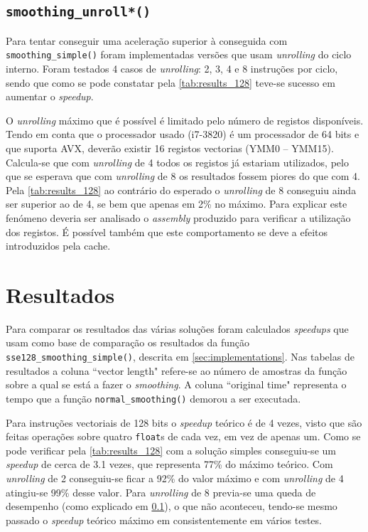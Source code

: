 \documentclass[a4paper]{article}
\begin{document}
	
	\subsection{\texttt{smoothing\_unroll*()}}
	\label{subsec:implementation_unrolling}
	
	Para tentar conseguir uma aceleração superior à conseguida com \texttt{smoothing\_simple()} foram implementadas versões que usam \textit{unrolling} do ciclo interno. Foram testados 4 casos de \textit{unrolling}: 2, 3, 4 e 8 instruções por ciclo, sendo que como se pode constatar pela \autoref{tab:results_128} teve-se sucesso em aumentar o \textit{speedup}.
	
	O \textit{unrolling} máximo que é possível é limitado pelo número de registos disponíveis. Tendo em conta que o processador usado (i7-3820) é um processador de 64 bits e que suporta AVX, deverão existir 16 registos vectorias (YMM0 -- YMM15). Calcula-se que com \textit{unrolling} de 4 todos os registos já estariam utilizados, pelo que se esperava que com \textit{unrolling} de 8 os resultados fossem piores do que com 4. Pela \autoref{tab:results_128} ao contrário do esperado o \textit{unrolling} de 8 conseguiu ainda ser superior ao de 4, se bem que apenas em 2\% no máximo. Para explicar este fenómeno deveria ser analisado o \textit{assembly} produzido para verificar a utilização dos registos. É possível também que este comportamento se deve a efeitos introduzidos pela cache.
	
	
	\section{Resultados} 
	
	Para comparar os resultados das várias soluções foram calculados \textit{speedups} que usam como base de comparação os resultados da função \texttt{sse128\_smoothing\_simple()}, descrita em \ref{sec:implementations}. Nas tabelas de resultados a coluna ``vector length" refere-se ao número de amostras da função sobre a qual se está a fazer o \textit{smoothing}. A coluna ``original time" representa o tempo que a função \texttt{normal\_smoothing()} demorou a ser executada.
	
	Para instruções vectoriais de 128 bits o \textit{speedup} teórico é de 4 vezes, visto que são feitas operações sobre quatro \texttt{float}s de cada vez, em vez de apenas um. Como se pode verificar pela \autoref{tab:results_128} com a solução simples conseguiu-se um \textit{speedup} de cerca de 3.1 vezes, que representa 77\% do máximo teórico. Com \textit{unrolling} de 2 conseguiu-se ficar a 92\% do valor máximo e com \textit{unrolling} de 4 atingiu-se 99\% desse valor. Para \textit{unrolling} de 8 previa-se uma queda de desempenho (como explicado em \ref{subsec:implementation_unrolling}), o que não aconteceu, tendo-se mesmo passado o \textit{speedup} teórico máximo em consistentemente em vários testes.
	
\end{document}
